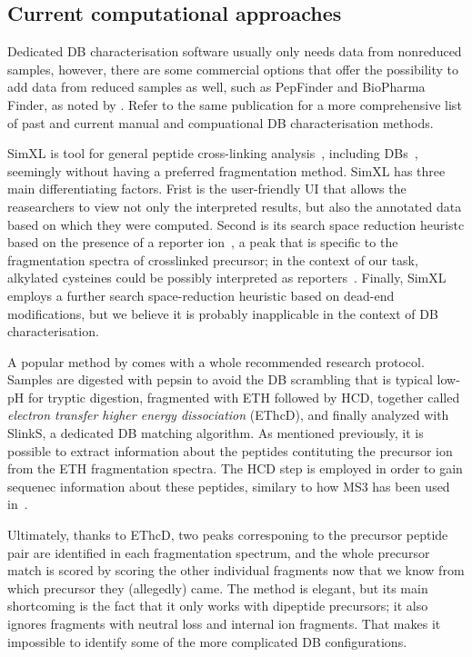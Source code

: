 \subsection{Current computational approaches}

Dedicated DB characterisation software usually only needs data from nonreduced samples, however, there are some commercial options that offer the possibility to add data from reduced samples as well, such as PepFinder and BioPharma Finder, as noted by \citet{lakbub2018recent}. Refer to the same publication for a more comprehensive list of past and current manual and compuational DB characterisation methods.

SimXL is tool for general peptide cross-linking analysis~\cite{lima2015sim}, including DBs~\cite{cui2019comprehensive}, seemingly without having a preferred fragmentation method. SimXL has three main differentiating factors. Frist is the user-friendly UI that allows the reasearchers to view not only the interpreted results, but also the annotated data based on which they were computed. Second is its search space reduction heuristc based on the presence of a reporter ion~\cite{iglesias2010identification}, a peak that is specific to the fragmentation spectra of crosslinked precursor; in the context of our task, alkylated cysteines could be possibly interpreted as reporters~\cite{wei2020identification}. Finally, SimXL employs a further search space-reduction heuristic based on dead-end modifications, but we believe it is probably inapplicable in the context of DB characterisation.

A popular method by \citet{liu2014facilitating} comes with a whole recommended research protocol. Samples are digested with pepsin to avoid the DB scrambling that is typical low-pH for tryptic digestion, fragmented with ETH followed by HCD, together called \emph{electron transfer higher energy dissociation} (EThcD), and finally analyzed with SlinkS, a dedicated DB matching algorithm. As mentioned previously, it is possible to extract information about the peptides contituting the precursor ion from the ETH fragmentation spectra. The HCD step is employed in order to gain sequenec information about these peptides, similary to how MS3 has been used in~\cite{wu2009mass}.

Ultimately, thanks to EThcD, two peaks corresponing to the precursor peptide pair are identified in each fragmentation spectrum, and the whole precursor match is scored by scoring the other individual fragments now that we know from which precursor they (allegedly) came. The method is elegant, but its main shortcoming is the fact that it only works with dipeptide precursors; it also ignores fragments with neutral loss and internal ion fragments. That makes it impossible to identify some of the more complicated DB configurations.

